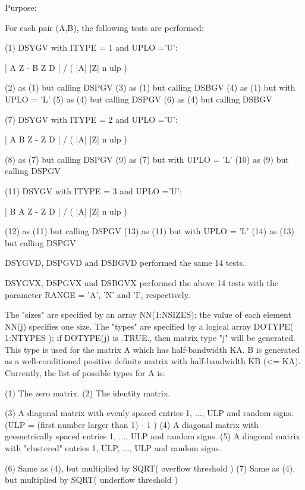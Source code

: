\begin{DoxyParagraph}{Purpose\+: }
\begin{DoxyVerb}
      For each pair (A,B), the following tests are performed:

      (1) DSYGV with ITYPE = 1 and UPLO ='U':

              | A Z - B Z D | / ( |A| |Z| n ulp )

      (2) as (1) but calling DSPGV
      (3) as (1) but calling DSBGV
      (4) as (1) but with UPLO = 'L'
      (5) as (4) but calling DSPGV
      (6) as (4) but calling DSBGV

      (7) DSYGV with ITYPE = 2 and UPLO ='U':

              | A B Z - Z D | / ( |A| |Z| n ulp )

      (8) as (7) but calling DSPGV
      (9) as (7) but with UPLO = 'L'
      (10) as (9) but calling DSPGV

      (11) DSYGV with ITYPE = 3 and UPLO ='U':

              | B A Z - Z D | / ( |A| |Z| n ulp )

      (12) as (11) but calling DSPGV
      (13) as (11) but with UPLO = 'L'
      (14) as (13) but calling DSPGV

      DSYGVD, DSPGVD and DSBGVD performed the same 14 tests.

      DSYGVX, DSPGVX and DSBGVX performed the above 14 tests with
      the parameter RANGE = 'A', 'N' and 'I', respectively.

      The "sizes" are specified by an array NN(1:NSIZES); the value
      of each element NN(j) specifies one size.
      The "types" are specified by a logical array DOTYPE( 1:NTYPES );
      if DOTYPE(j) is .TRUE., then matrix type "j" will be generated.
      This type is used for the matrix A which has half-bandwidth KA.
      B is generated as a well-conditioned positive definite matrix
      with half-bandwidth KB (<= KA).
      Currently, the list of possible types for A is:

      (1)  The zero matrix.
      (2)  The identity matrix.

      (3)  A diagonal matrix with evenly spaced entries
           1, ..., ULP  and random signs.
           (ULP = (first number larger than 1) - 1 )
      (4)  A diagonal matrix with geometrically spaced entries
           1, ..., ULP  and random signs.
      (5)  A diagonal matrix with "clustered" entries
           1, ULP, ..., ULP and random signs.

      (6)  Same as (4), but multiplied by SQRT( overflow threshold )
      (7)  Same as (4), but multiplied by SQRT( underflow threshold )


\end{DoxyVerb}
\end{DoxyParagraph}
